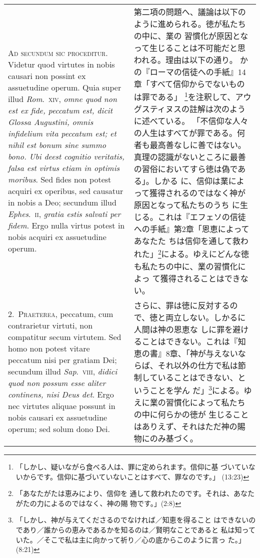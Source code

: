 \documentclass[10pt]{jsarticle}
\begin{document}
\begin{longtable}{p{21em}p{21em}}
{\scshape Ad secundum sic proceditur}. Videtur quod virtutes in nobis
causari non possint ex assuetudine operum. Quia super illud {\itshape
Rom}.~{\scshape xiv}, {\itshape omne quod non est ex fide, peccatum
est, dicit Glossa Augustini, omnis infidelium vita peccatum est; et
nihil est bonum sine summo bono. Ubi deest cognitio veritatis, falsa
est virtus etiam in optimis moribus}. Sed fides non potest acquiri ex
operibus, sed causatur in nobis a Deo; secundum illud {\itshape
Ephes}.~{\scshape ii}, {\itshape gratia estis salvati per fidem}. Ergo
nulla virtus potest in nobis acquiri ex assuetudine operum.

&

 第二項の問題へ、議論は以下のように進められる。徳が私たちの中に、業の
 習慣化が原因となって生じることは不可能だと思われる。理由は以下の通り。
 かの『ローマの信徒への手紙』14章「すべて信仰からでないものは罪である」
 \footnote{「しかし、疑いながら食べる人は、罪に定められます。信仰に基
 づいていないからです。信仰に基づいていないことはすべて、罪なのです。」
 (13:23)}を注釈して、アウグスティヌスの註解は次のように述べている。
 「不信仰な人々の人生はすべてが罪である。何者も最高善なしに善ではない。
 真理の認識がないところに最善の習俗においてすら徳は偽である」。しかる
 に、信仰は業によって獲得されるのではなく神が原因となって私たちのうち
 に生じる。これは『エフェソの信徒への手紙』第2章「恩恵によってあなたた
 ちは信仰を通して救われた」\footnote{「あなたがたは恵みにより、信仰を
 通して救われたのです。それは、あなたがたの力によるのではなく、神の賜
 物です。」(2:8)}による。ゆえにどんな徳も私たちの中に、業の習慣化によっ
 て獲得されることはできない。
 
\\



2.~{\scshape Praeterea}, peccatum, cum contrarietur virtuti, non
compatitur secum virtutem. Sed homo non potest vitare peccatum nisi
per gratiam Dei; secundum illud {\itshape Sap}.~{\scshape viii},
{\itshape didici quod non possum esse aliter continens, nisi Deus
det}. Ergo nec virtutes aliquae possunt in nobis causari ex
assuetudine operum; sed solum dono Dei.

&

さらに、罪は徳に反対するので、徳と両立しない。しかるに人間は神の恩恵な
しに罪を避けることはできない。これは『知恵の書』8章、「神が与えないな
らば、それ以外の仕方で私は節制していることはできない、ということを学ん
だ」\footnote{「しかし、神が与えてくださるのでなければ／知恵を得ること
はできないのであり／誰からの恵みであるかを知るのは／賢明なことであると
私は知っていた。／そこで私は主に向かって祈り／心の底からこのように言っ
た。」(8:21)}による。ゆえに業の習慣化によって私たちの中に何らかの徳が
生じることはありえず、それはただ神の賜物にのみ基づく。
 

\end{longtable}
\end{document}
